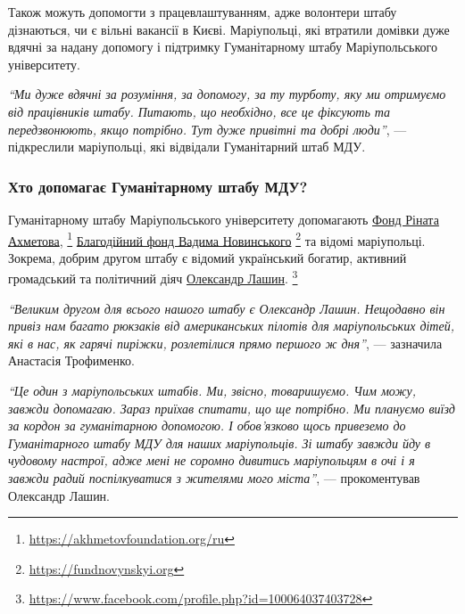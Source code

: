 Також можуть допомогти з працевлаштуванням, адже волонтери штабу дізнаються, чи
є вільні вакансії в Києві. Маріупольці, які втратили домівки дуже вдячні за
надану допомогу і підтримку Гуманітарному штабу Маріупольського університету.

\begin{leftbar}
\emph{\enquote{Ми дуже вдячні за розуміння, за допомогу, за ту турботу, яку ми отримуємо від
працівників штабу. Питають, що необхідно, все це фіксують та
передзвонюють, якщо потрібно. Тут дуже привітні та добрі люди}}, —
підкреслили маріупольці, які відвідали Гуманітарний штаб МДУ.
\end{leftbar}


\subsubsection{Хто допомагає Гуманітарному штабу МДУ?}

Гуманітарному штабу Маріупольського університету допомагають \href{https://akhmetovfoundation.org/ru}{Фонд Ріната
Ахметова},%
\footnote{\url{https://akhmetovfoundation.org/ru}}
\href{https://fundnovynskyi.org}{Благодійний фонд Вадима Новинського}%
\footnote{\url{https://fundnovynskyi.org}} та відомі маріупольці. Зокрема,
добрим другом штабу є відомий український богатир, активний громадський та
політичний діяч \href{https://www.facebook.com/profile.php?id=100064037403728}{Олександр Лашин}.%
\footnote{\url{https://www.facebook.com/profile.php?id=100064037403728}}


\begin{leftbar}
\emph{\enquote{Великим другом для всього нашого штабу є Олександр Лашин. Нещодавно він привіз
нам багато рюкзаків від американських пілотів для маріупольських дітей, які в
нас, як гарячі пиріжки, розлетілися прямо першого ж дня}}, — зазначила Анастасія
Трофименко.
\end{leftbar}


\begin{leftbar}
\emph{\enquote{Це один з маріупольських штабів. Ми, звісно, товаришуємо. Чим можу, завжди
допомагаю. Зараз приїхав спитати, що ще потрібно. Ми плануємо виїзд за кордон
за гуманітарною допомогою. І обов'язково щось привеземо до Гуманітарного штабу
МДУ для наших маріупольців. Зі штабу завжди йду в чудовому настрої, адже мені
не соромно дивитись маріупольцям в очі і я завжди радий поспілкуватися з
жителями мого міста}}, — прокоментував Олександр Лашин.
\end{leftbar}

